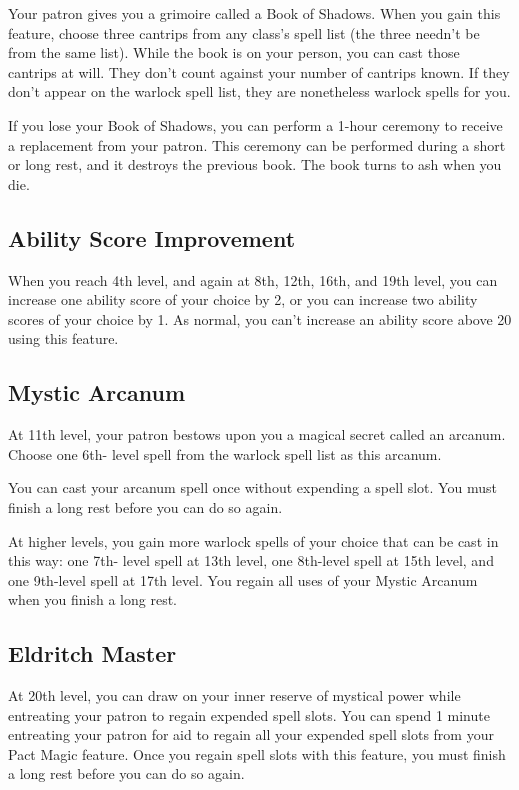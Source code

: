 Your patron gives you a grimoire called a Book of Shadows. When you gain this feature, choose three cantrips from any class’s spell list (the three needn’t be from the same list). While the book is on your person, you can cast those cantrips at will. They don’t count against your number of cantrips known. If they don’t appear on the warlock spell list, they are nonetheless warlock spells for you.

If you lose your Book of Shadows, you can perform a 1-hour ceremony to receive a replacement from your patron. This ceremony can be performed during a short or long rest, and it destroys the previous book. The book turns to ash when you die.

\subsection{Ability Score Improvement}

When you reach 4th level, and again at 8th, 12th, 16th, and 19th level, you can increase one ability score of your choice by 2, or you can increase two ability scores of your choice by 1. As normal, you can’t increase an ability score above 20 using this feature.

\subsection{Mystic Arcanum}

At 11th level, your patron bestows upon you a magical secret called an arcanum. Choose one 6th- level spell from the warlock spell list as this arcanum.

You can cast your arcanum spell once without expending a spell slot. You must finish a long rest before you can do so again.

At higher levels, you gain more warlock spells of your choice that can be cast in this way: one 7th- level spell at 13th level, one 8th-level spell at 15th level, and one 9th-level spell at 17th level. You regain all uses of your Mystic Arcanum when you finish a long rest.

\subsection{Eldritch Master}

At 20th level, you can draw on your inner reserve of mystical power while entreating your patron to regain expended spell slots. You can spend 1 minute entreating your patron for aid to regain all your expended spell slots from your Pact Magic feature. Once you regain spell slots with this feature, you must finish a long rest before you can do so again.

